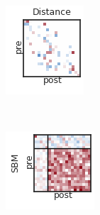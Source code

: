 \begin{figure}[t!]
\begin{subfigure}[b]{1.10in}
  \end{subfigure}
  ~
  \hspace{-.1in}
  \begin{subfigure}[b]{1.10in}
    \centering
    \includegraphics[width=\textwidth]{figures/ch3/Distance-Gaussian.png}
  \end{subfigure}
  \\
  \vspace{-.1in}
  \begin{subfigure}[b]{1.25in}
    \centering
    \includegraphics[width=\textwidth]{figures/ch3/Dense-SBM.png}

\end{subfigure}
\end{figure}
